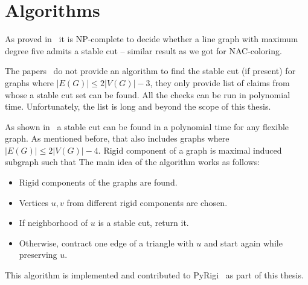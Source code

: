 \section{Algorithms}

As proved in~\cite{stable_cuts_complexity} it is NP-complete
to decide whether a line graph with maximum degree five admits a stable cut
-- similar result as we got for NAC-coloring.

The papers~\cite{stable_cuts_2v_3,stable_cuts_2v_3_revisit} do not provide
an algorithm to find the stable cut (if present)
for graphs where \(|E(G)| \le 2|V(G)|-3 \),
they only provide list of claims
from whose a stable cut set can be found.
All the checks can be run in polynomial time.
Unfortunately, the list is long and beyond the scope of this thesis.

As shown in~\cite[Algorithm 1]{stable_cuts_legersky} a stable cut can be found
in a polynomial time for any flexible graph.
As mentioned before, that also includes graphs where \( |E(G)| \le 2|V(G)| - 4 \).
Rigid component of a graph is maximal induced subgraph such that
The main idea of the algorithm works as follows:
%
\begin{itemize}
	\item Rigid components of the graphs are found.
	\item Vertices \( u, v \) from different rigid components are chosen.
	\item If neighborhood of \( u \) is a stable cut, return it.
	\item Otherwise, contract one edge of a triangle with \( u \) and start again while preserving \( u \).
\end{itemize}
%
This algorithm is implemented and
contributed to PyRigi~\cite{pyrigi} as part of this thesis.

